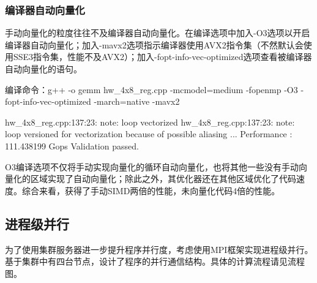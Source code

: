 \documentclass[UTF8,10pt]{ctexart}
\begin{document}
\subsubsection{编译器自动向量化}
手动向量化的粒度往往不及编译器自动向量化。在编译选项中加入-O3选项以开启编译器自动向量化；加入-mavx2选项指示编译器使用AVX2指令集（不然默认会使用SSE3指令集，性能不及AVX2）；加入-fopt-info-vec-optimized选项查看被编译器自动向量化的语句。
\begin{python}
编译命令：g++ -o gemm hw_4x8_reg.cpp -mcmodel=medium -fopenmp -O3 -fopt-info-vec-optimized -march=native -mavx2
\end{python}
\begin{python}
hw_4x8_reg.cpp:137:23: note: loop vectorized
hw_4x8_reg.cpp:137:23: note: loop versioned for vectorization because of possible aliasing
...
Performance : 111.438199 Gops
Validation passed.
\end{python}
O3编译选项不仅将手动实现向量化的循环自动向量化，也将其他一些没有手动向量化的区域实现了自动向量化；除此之外，其优化器还在其他区域优化了代码速度。综合来看，获得了手动SIMD两倍的性能，未向量化代码4倍的性能。

\subsection{进程级并行}
为了使用集群服务器进一步提升程序并行度，考虑使用MPI框架实现进程级并行。基于集群中有四台节点，设计了程序的并行通信结构。具体的计算流程请见流程图。
\end{document}
